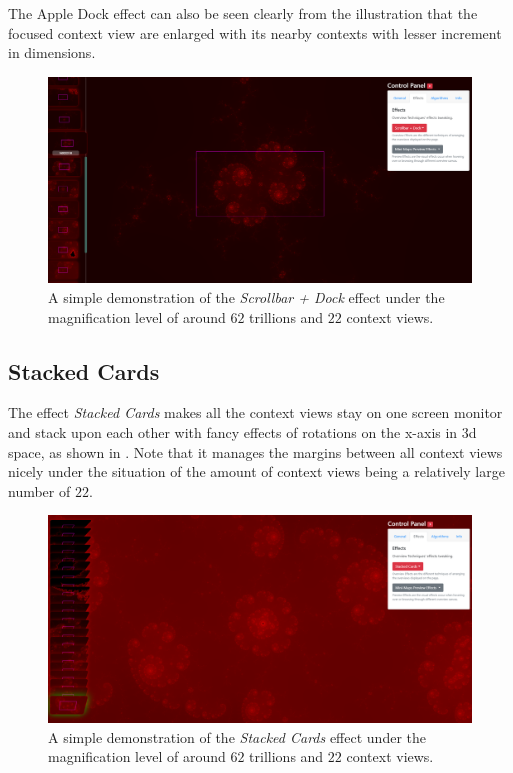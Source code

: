 The Apple Dock effect can also be seen clearly from the illustration that the focused context view are enlarged with its nearby contexts with lesser increment in dimensions.

\begin{figure}[H]
\centering
\includegraphics[width=\textwidth,keepaspectratio]{Figures/Chapter5/scrollbar.png}
\decoRule
\caption[Scrollbar + Dock Effect]{A simple demonstration of the \emph{Scrollbar + Dock} effect under the magnification level of around $62$ trillions and $22$ context views.}
\label{fig:chap5:scrollbar}
\end{figure}

\subsection{Stacked Cards}
\label{chap5:cards}

The effect \emph{Stacked Cards} makes all the context views stay on one screen monitor and stack upon each other with fancy effects of rotations on the x-axis in 3d space, as shown in . Note that it manages the margins between all context views nicely under the situation of the amount of context views being a relatively large number of $22$.

\begin{figure}[H]
\centering
\includegraphics[width=\textwidth,keepaspectratio]{Figures/Chapter5/cards.png}
\decoRule
\caption[Stacked Cards Effect]{A simple demonstration of the \emph{Stacked Cards} effect under the magnification level of around $62$ trillions and $22$ context views.}
\label{fig:chap5:cards}
\end{figure}

